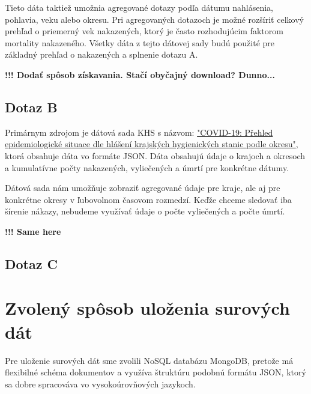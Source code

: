 \documentclass[11pt, a4paper]{article}
\begin{document}
\hfill \break
Tieto dáta taktiež umožnia agregované dotazy podľa dátumu nahlásenia, pohlavia, veku alebo okresu. Pri agregovaných dotazoch je možné rozšíriť celkový prehľad o priemerný vek nakazených, ktorý je často rozhodujúcim faktorom mortality nakazeného. Všetky dáta z tejto dátovej sady budú použité pre základný prehľad o nakazených a splnenie dotazu A.

\hfill \break
\textbf{!!! Dodať spôsob získavania. Stačí obyčajný download? Dunno...}
\subsection*{Dotaz B}
Primárnym zdrojom je dátová sada KHS s názvom: \href{https://onemocneni-aktualne.mzcr.cz/api/v2/covid-19}{"COVID-19: Přehled epidemiologické situace dle hlášení krajských hygienických stanic podle okresu"}, ktorá obsahuje dáta vo formáte JSON. Dáta obsahujú údaje o krajoch a okresoch a kumulatívne počty nakazených, vyliečených a úmrtí pre konkrétne dátumy.

\hfill \break
Dátová sada nám umožňuje zobraziť agregované údaje pre kraje, ale aj pre konkrétne okresy v ľubovolnom časovom rozmedzí. Keďže chceme sledovať iba šírenie nákazy, nebudeme využívať údaje o počte vyliečených a počte úmrtí.

\hfill \break
\textbf{!!! Same here}

\subsection*{Dotaz C}

\section*{Zvolený spôsob uloženia surových dát}
Pre uloženie surových dát sme zvolili NoSQL databázu MongoDB, pretože má flexibilné schéma dokumentov a využíva štruktúru podobnú formátu JSON, ktorý sa dobre spracováva vo vysokoúrovňových jazykoch.
\end{document}
